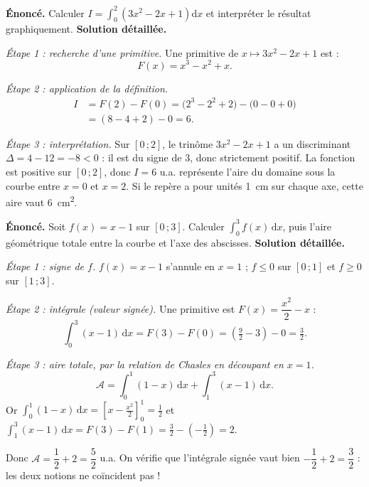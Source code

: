 \documentclass[11pt]{article}
\newcounter{popsec}
\newcounter{popsub}
\newcommand{\courssub}[1]{%
  \stepcounter{popsub}%
  \par\vspace{9pt}\noindent{\popxbold\fontsize{11.5}{13}\selectfont\color{popink}{\color{poporange}\thepopsec.\thepopsub}\hspace{6pt}#1}\par\nopagebreak\vspace{4pt}
}
\begin{document}
\courssub{Exemples résolus}

\begin{exoresolu}
\textbf{Énoncé.} Calculer $\displaystyle I = \int_0^2 \left(3x^2-2x+1\right)\mathrm{d}x$ et interpréter le résultat graphiquement.
\tcblower
\textbf{Solution détaillée.}

\emph{Étape 1 : recherche d'une primitive.} Une primitive de $x\mapsto 3x^2-2x+1$ est :
\[ F(x) = x^3 - x^2 + x. \]

\emph{Étape 2 : application de la définition.}
\begin{align*}
I &= F(2)-F(0) = \big(2^3-2^2+2\big)-\big(0-0+0\big) \\
  &= (8-4+2)-0 = 6.
\end{align*}

\emph{Étape 3 : interprétation.} Sur $[0\,;2]$, le trinôme $3x^2-2x+1$ a un discriminant $\Delta = 4-12 = -8 < 0$ : il est du signe de $3$, donc strictement positif. La fonction est positive sur $[0\,;2]$, donc $I=6$ u.a. représente l'aire du domaine sous la courbe entre $x=0$ et $x=2$. Si le repère a pour unités \SI{1}{cm} sur chaque axe, cette aire vaut \SI{6}{cm^2}.
\end{exoresolu}

\begin{exoresolu}
\textbf{Énoncé.} Soit $f(x)=x-1$ sur $[0\,;3]$. Calculer $\displaystyle\int_0^3 f(x)\,\mathrm{d}x$, puis l'aire géométrique totale entre la courbe et l'axe des abscisses.
\tcblower
\textbf{Solution détaillée.}

\emph{Étape 1 : signe de $f$.} $f(x)=x-1$ s'annule en $x=1$ ; $f\leq 0$ sur $[0\,;1]$ et $f\geq 0$ sur $[1\,;3]$.

\emph{Étape 2 : intégrale (valeur signée).} Une primitive est $F(x)=\dfrac{x^2}{2}-x$ :
\[ \int_0^3 (x-1)\,\mathrm{d}x = F(3)-F(0) = \left(\tfrac{9}{2}-3\right)-0 = \tfrac{3}{2}. \]

\emph{Étape 3 : aire totale, par la relation de Chasles en découpant en $x=1$.}
\[ \mathcal{A} = \int_0^1 (1-x)\,\mathrm{d}x + \int_1^3 (x-1)\,\mathrm{d}x. \]
Or $\displaystyle\int_0^1 (1-x)\,\mathrm{d}x = \left[x-\tfrac{x^2}{2}\right]_0^1 = \tfrac{1}{2}$ et $\displaystyle\int_1^3 (x-1)\,\mathrm{d}x = F(3)-F(1) = \tfrac{3}{2}-\left(-\tfrac{1}{2}\right) = 2$.

Donc $\mathcal{A} = \dfrac{1}{2}+2 = \dfrac{5}{2}$ u.a. On vérifie que l'intégrale signée vaut bien $-\dfrac{1}{2}+2 = \dfrac{3}{2}$ : les deux notions ne coïncident pas !
\end{exoresolu}
\end{document}
